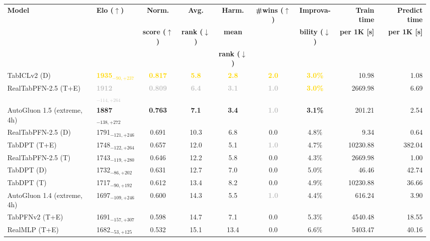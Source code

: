 \begin{tabular}{llcccccrr}
\toprule
\textbf{Model} & \textbf{Elo ($\uparrow$)} & \textbf{Norm.} & \textbf{Avg.} & \textbf{Harm.} & \textbf{\#wins ($\uparrow$)} & \textbf{Improva-} & \textbf{Train time} & \textbf{Predict time} \\
 &  & \textbf{score ($\uparrow$)} & \textbf{rank ($\downarrow$)} & \textbf{mean} &  & \textbf{bility ($\downarrow$)} & \textbf{per 1K [s]} & \textbf{per 1K [s]} \\
 &  &  &  & \textbf{rank ($\downarrow$)} &  &  &  &  \\
\midrule
TabICLv2 (D) & \textcolor{gold}{\textbf{1935${}_{-90,+237}$}} & \textcolor{gold}{\textbf{0.817}} & \textcolor{gold}{\textbf{5.8}} & \textcolor{gold}{\textbf{2.8}} & \textcolor{gold}{\textbf{2.0}} & \textcolor{gold}{\textbf{3.0\%}} & 10.98 & 1.08 \\
RealTabPFN-2.5 (T+E) & \textcolor{silver}{\textbf{1912${}_{-114,+264}$}} & \textcolor{silver}{\textbf{0.809}} & \textcolor{silver}{\textbf{6.4}} & \textcolor{silver}{\textbf{3.1}} & \textcolor{silver}{\textbf{1.0}} & \textcolor{gold}{\textbf{3.0\%}} & 2669.98 & 6.69 \\
AutoGluon 1.5 (extreme, 4h) & \textcolor{bronze}{\textbf{1887${}_{-138,+272}$}} & \textcolor{bronze}{\textbf{0.763}} & \textcolor{bronze}{\textbf{7.1}} & \textcolor{bronze}{\textbf{3.4}} & \textcolor{silver}{\textbf{1.0}} & \textcolor{bronze}{\textbf{3.1\%}} & 201.21 & 2.54 \\
RealTabPFN-2.5 (D) & 1791${}_{-121,+246}$ & 0.691 & 10.3 & 6.8 & 0.0 & 4.8\% & 9.34 & 0.64 \\
TabDPT (T+E) & 1748${}_{-122,+264}$ & 0.657 & 12.0 & 5.1 & \textcolor{silver}{\textbf{1.0}} & 4.7\% & 10230.88 & 382.04 \\
RealTabPFN-2.5 (T) & 1743${}_{-119,+280}$ & 0.646 & 12.2 & 5.8 & 0.0 & 4.3\% & 2669.98 & 1.00 \\
TabDPT (D) & 1732${}_{-86,+202}$ & 0.631 & 12.7 & 7.0 & 0.0 & 5.0\% & 46.46 & 42.74 \\
TabDPT (T) & 1717${}_{-90,+192}$ & 0.612 & 13.4 & 8.2 & 0.0 & 4.9\% & 10230.88 & 36.66 \\
AutoGluon 1.4 (extreme, 4h) & 1697${}_{-109,+246}$ & 0.600 & 14.3 & 5.5 & \textcolor{silver}{\textbf{1.0}} & 4.4\% & 616.24 & 3.90 \\
TabPFNv2 (T+E) & 1691${}_{-157,+307}$ & 0.598 & 14.7 & 7.1 & 0.0 & 5.3\% & 4540.48 & 18.55 \\
RealMLP (T+E) & 1682${}_{-53,+125}$ & 0.532 & 15.1 & 13.4 & 0.0 & 6.6\% & 5403.47 & 40.16 \\

\end{tabular}
